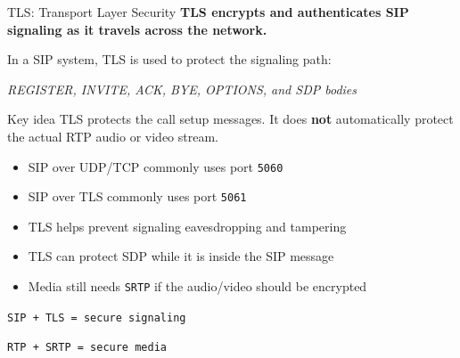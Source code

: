 \documentclass[aspectratio=169]{beamer}
\begin{document}
\begin{frame}{TLS: Transport Layer Security}
\textbf{TLS encrypts and authenticates SIP signaling as it travels across the network.}

\vspace{0.35cm}

In a SIP system, TLS is used to protect the signaling path:

\begin{center}
\textit{REGISTER, INVITE, ACK, BYE, OPTIONS, and SDP bodies}
\end{center}

\begin{block}{Key idea}
TLS protects the call setup messages. It does \textbf{not} automatically protect the actual RTP audio or video stream.
\end{block}


\begin{itemize}
    \item SIP over UDP/TCP commonly uses port \texttt{5060}
    \item SIP over TLS commonly uses port \texttt{5061}
    \item TLS helps prevent signaling eavesdropping and tampering
    \item TLS can protect SDP while it is inside the SIP message
    \item Media still needs \texttt{SRTP} if the audio/video should be encrypted
\end{itemize}

\vspace{0.25cm}

\begin{center}
\texttt{SIP + TLS = secure signaling}

\texttt{RTP + SRTP = secure media}
\end{center}

\end{frame}
\end{document}
